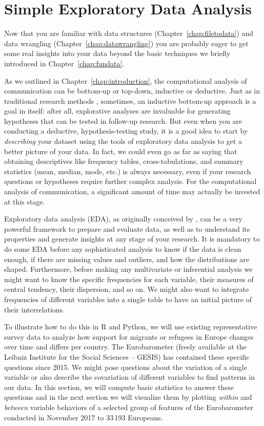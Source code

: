 %
\section{Simple Exploratory Data Analysis}
\label{sec:simpleeda}

Now that you are familiar with data structures (Chapter~\ref{chap:filetodata}) and data wrangling (Chapter~\ref{chap:datawrangling}) you are probably eager to get some real insights into your data beyond the basic techniques we briefly introduced in Chapter~\ref{chap:fundata}.

As we outlined in Chapter~\ref{chap:introduction}, the computational analysis
of communication can be  bottom-up or top-down, inductive or
deductive.  Just as in traditional research methods \cite[for an
  overview, see, for example,][]{Bryman2012}, sometimes, an inductive
bottom-up approach is a goal in itself: after all, explorative
analyses are invaluable for generating hypotheses that can be tested
in follow-up research. But even when you are conducting a deductive,
hypothesis-testing study, it is a good idea to start by
\emph{describing} your dataset using the tools of exploratory data
analysis to get a better picture of your data. In fact, we could even
go as far as saying that obtaining descriptives like frequency tables,
cross-tabulations, and summary statistics (mean, median, mode, etc.)
is always necessary, even if your research questions or hypotheses
require further complex analysis. For the computational analysis of
communication, a significant amount of time may actually be invested
at this stage.

Exploratory data analysis (EDA), as originally conceived by \citet{tukey1977exploratory}, can be a very powerful framework to prepare and evaluate data, as well as to understand its properties and generate insights at any stage of your research.
It is mandatory to do some EDA before any sophisticated analysis to know if the data is clean enough, if there are missing values and outliers, and how the distributions are shaped.
Furthermore, before making any multivariate or inferential analysis we might want to know the specific frequencies for each variable, their measures of central tendency, their dispersion, and so on. We might also want to integrate frequencies of different variables into a single table to have an initial picture of their interrelations.

To illustrate how to do this in R and Python, we will use existing representative survey data to analyze how support for migrants or refugees in Europe changes over time and differs per country.
 The Eurobarometer (freely available at the Leibniz Institute for the Social Sciences -- GESIS) has contained these specific questions since 2015. We might pose questions about the variation of a single variable or also describe the covariation of different variables to find patterns in our data. In this section, we will compute basic statistics to answer  these questions and in the next section we will visualize them by plotting \textit{within} and \textit{between} variable behaviors of a selected group of features of the Eurobarometer conducted in November 2017 to 33\,193 Europeans.

